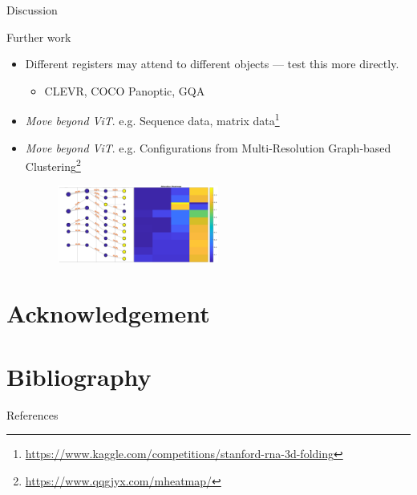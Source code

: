 \documentclass[aspectratio=169]{beamer}
\begin{document}
\begin{section}{Discussion}
\begin{subsection}{Further work}
\begin{frame}
\begin{itemize}
    \item Different registers may attend to different objects — test this more directly.
    \begin{itemize}
        \item CLEVR, COCO Panoptic, GQA
    \end{itemize}
    \item \emph{Move beyond ViT}. e.g. Sequence data, matrix data\footnote{\url{https://www.kaggle.com/competitions/stanford-rna-3d-folding}}
    \item \emph{Move beyond ViT}. e.g. Configurations from Multi-Resolution Graph-based Clustering\footnote{\url{https://www.qqgjyx.com/mheatmap/}}
    \begin{figure}[t]
        \centering
        \includegraphics[width=0.5\textwidth]{figures/cifar10_attnmap.png}
    \end{figure}
\end{itemize}
\end{frame}

\end{subsection}

\end{section}


\section*{Acknowledgement}



\section*{Bibliography}
\appendix

\begin{frame}{References}
    \printbibliography[heading=none]
\end{frame}
\end{document}
